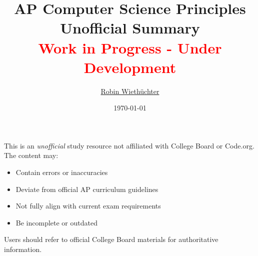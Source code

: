 \documentclass[11pt,oneside]{book}
\title{
    \Huge AP Computer Science Principles\\
    \Large Unofficial Summary\\[0.5em]
    \normalsize\textcolor{red}{Work in Progress - Under Development}
}
\author{\href{https://rowi.dev/}{Robin Wiethüchter}}
\date{\today}
\begin{document}
\maketitle

\begin{tcolorbox}[
    title=Disclaimer,
    colback=white,
    colframe=black,
    width=\textwidth-2cm,
    center
]
This is an \textit{unofficial} study resource not affiliated with College Board\textsuperscript{\textregistered} or Code.org\textsuperscript{\textregistered}. The content may:
\begin{itemize}[leftmargin=*,noitemsep]
    \item Contain errors or inaccuracies
    \item Deviate from official AP\textsuperscript{\textregistered} curriculum guidelines
    \item Not fully align with current exam requirements
    \item Be incomplete or outdated
\end{itemize}
Users should refer to official College Board\textsuperscript{\textregistered} materials for authoritative information.
\end{tcolorbox}

\tableofcontents














\end{document}
